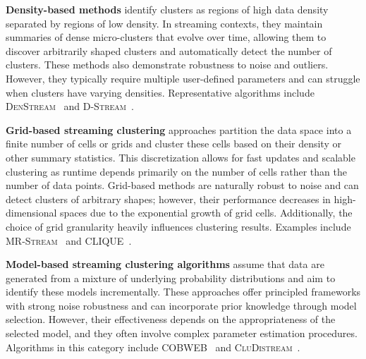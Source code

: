 \textbf{Density-based methods} identify clusters as regions of high data density separated by
regions of low density. In streaming contexts, they maintain summaries of dense micro-clusters
that evolve over time, allowing them to discover arbitrarily shaped clusters and automatically
detect the number of clusters. These methods also demonstrate robustness to noise and outliers.
However, they typically require multiple user-defined parameters and can struggle when clusters
have varying densities. Representative algorithms include \textsc{DenStream}~\cite{denstream}
and \textsc{D-Stream}~\cite{d_stream}.

\textbf{Grid-based streaming clustering} approaches partition the data space into a finite number
of cells or grids and cluster these cells based on their density or other summary statistics. This
discretization allows for fast updates and scalable clustering as runtime depends primarily on the
number of cells rather than the number of data points. Grid-based methods are naturally robust to
noise and can detect clusters of arbitrary shapes; however, their performance decreases in high-dimensional
spaces due to the exponential growth of grid cells. Additionally, the choice of grid granularity heavily
influences clustering results. Examples include \textsc{MR-Stream}~\cite{mr_stream}
and \textsc{CLIQUE}~\cite{clique}.

\textbf{Model-based streaming clustering algorithms} assume that data are generated from a mixture of
underlying probability distributions and aim to identify these models incrementally. These approaches
offer principled frameworks with strong noise robustness and can incorporate prior knowledge through
model selection. However, their effectiveness depends on the appropriateness of the selected model,
and they often involve complex parameter estimation procedures. Algorithms in this category include
\textsc{COBWEB}~\cite{cobweb} and \textsc{CluDistream}~\cite{cludistream}.

